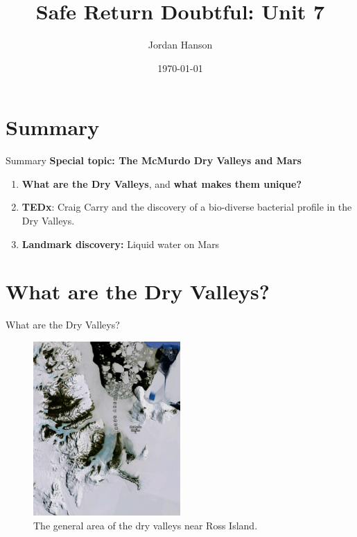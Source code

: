 \documentclass{beamer}
\title{Safe Return Doubtful: Unit 7}
\date{\today}
\author{Jordan Hanson}
\institute{Whittier College Department of Physics and Astronomy}
\begin{document}
\maketitle

\section{Summary}

\begin{frame}{Summary}
\textbf{Special topic: The McMurdo Dry Valleys and Mars}
\begin{enumerate}
\item \textbf{What are the Dry Valleys}, and \textbf{what makes them unique?}
\item \textbf{TEDx}: Craig Carry and the discovery of a bio-diverse bacterial profile in the Dry Valleys.
\item \textbf{Landmark discovery:} Liquid water on Mars
\end{enumerate}
\end{frame}

\section{What are the Dry Valleys?}

\begin{frame}{What are the Dry Valleys?}
\begin{figure}
\centering
\includegraphics[width=0.5\textwidth]{dryvalleymap.png}
\caption{\label{fig:map} The general area of the dry valleys near Ross Island.}
\end{figure}
\end{frame}
\end{document}
